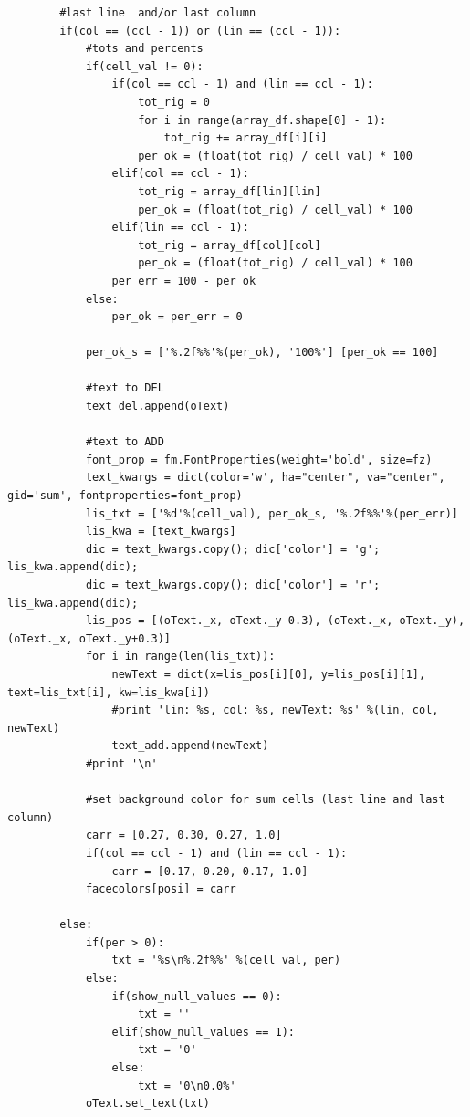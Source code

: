 \begin{verbatim}
        #last line  and/or last column
        if(col == (ccl - 1)) or (lin == (ccl - 1)):
            #tots and percents
            if(cell_val != 0):
                if(col == ccl - 1) and (lin == ccl - 1):
                    tot_rig = 0
                    for i in range(array_df.shape[0] - 1):
                        tot_rig += array_df[i][i]
                    per_ok = (float(tot_rig) / cell_val) * 100
                elif(col == ccl - 1):
                    tot_rig = array_df[lin][lin]
                    per_ok = (float(tot_rig) / cell_val) * 100
                elif(lin == ccl - 1):
                    tot_rig = array_df[col][col]
                    per_ok = (float(tot_rig) / cell_val) * 100
                per_err = 100 - per_ok
            else:
                per_ok = per_err = 0

            per_ok_s = ['%.2f%%'%(per_ok), '100%'] [per_ok == 100]

            #text to DEL
            text_del.append(oText)

            #text to ADD
            font_prop = fm.FontProperties(weight='bold', size=fz)
            text_kwargs = dict(color='w', ha="center", va="center", gid='sum', fontproperties=font_prop)
            lis_txt = ['%d'%(cell_val), per_ok_s, '%.2f%%'%(per_err)]
            lis_kwa = [text_kwargs]
            dic = text_kwargs.copy(); dic['color'] = 'g'; lis_kwa.append(dic);
            dic = text_kwargs.copy(); dic['color'] = 'r'; lis_kwa.append(dic);
            lis_pos = [(oText._x, oText._y-0.3), (oText._x, oText._y), (oText._x, oText._y+0.3)]
            for i in range(len(lis_txt)):
                newText = dict(x=lis_pos[i][0], y=lis_pos[i][1], text=lis_txt[i], kw=lis_kwa[i])
                #print 'lin: %s, col: %s, newText: %s' %(lin, col, newText)
                text_add.append(newText)
            #print '\n'

            #set background color for sum cells (last line and last column)
            carr = [0.27, 0.30, 0.27, 1.0]
            if(col == ccl - 1) and (lin == ccl - 1):
                carr = [0.17, 0.20, 0.17, 1.0]
            facecolors[posi] = carr

        else:
            if(per > 0):
                txt = '%s\n%.2f%%' %(cell_val, per)
            else:
                if(show_null_values == 0):
                    txt = ''
                elif(show_null_values == 1):
                    txt = '0'
                else:
                    txt = '0\n0.0%'
            oText.set_text(txt)


\end{verbatim}
